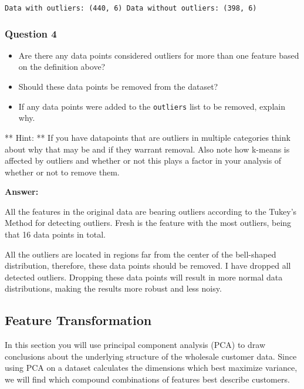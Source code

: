 \documentclass[11pt]{article}
\providecommand{\tightlist}{%
      \setlength{\itemsep}{0pt}\setlength{\parskip}{0pt}}
\begin{document}
    
    \begin{Verbatim}[commandchars=\\\{\}]
Data with outliers: (440, 6) Data without outliers: (398, 6)

    \end{Verbatim}

    \subsubsection{Question 4}\label{question-4}

\begin{itemize}
\tightlist
\item
  Are there any data points considered outliers for more than one
  feature based on the definition above?
\item
  Should these data points be removed from the dataset?
\item
  If any data points were added to the \texttt{outliers} list to be
  removed, explain why.
\end{itemize}

** Hint: ** If you have datapoints that are outliers in multiple
categories think about why that may be and if they warrant removal. Also
note how k-means is affected by outliers and whether or not this plays a
factor in your analysis of whether or not to remove them.

    \textbf{Answer:}

All the features in the original data are bearing outliers according to
the Tukey's Method for detecting outliers. Fresh is the feature with the
most outliers, being that 16 data points in total.

All the outliers are located in regions far from the center of the
bell-shaped distribution, therefore, these data points should be
removed. I have dropped all detected outliers. Dropping these data
points will result in more normal data distributions, making the results
more robust and less noisy.

    \subsection{Feature Transformation}\label{feature-transformation}

In this section you will use principal component analysis (PCA) to draw
conclusions about the underlying structure of the wholesale customer
data. Since using PCA on a dataset calculates the dimensions which best
maximize variance, we will find which compound combinations of features
best describe customers.
\end{document}
